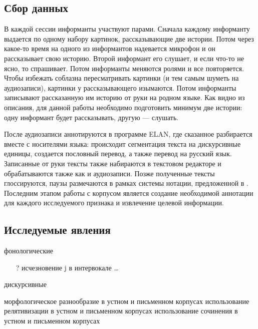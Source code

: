 \subsection{Сбор данных}
\noindent В каждой сессии информанты участвуют парами. Сначала каждому информанту выдается по одному набору картинок, рассказывающие две истории. Потом через какое-то время на одного из информантов надевается микрофон и он рассказывает свою историю. Второй информант его слушает, и если что-то не ясно, то спрашивает. Потом информанты меняются ролями и все повторяется. Чтобы избежать соблазна пересматривать картинки (и тем самым шуметь на аудиозаписи), картинки у рассказывающего изымаются. Потом информанты записывают рассказанную им историю от руки на родном языке. Как видно из описания, для данной работы необходимо подготовить минимум две истории: одну информант будет рассказывать, другую --- слушать.
\par После аудиозаписи аннотируются в программе ELAN, где сказанное разбирается вместе с носителями языка: происходит сегментация текста на дискурсивные единицы, создается пословный перевод, а также перевод на русский язык. Записанные от руки тексты также набираются в текстовом редакторе и обрабатываются также как и аудиозаписи. Позже полученные тексты глоссируются, паузы размечаются в рамках системы нотации, предложенной в \citep{kibrik14}. Последним этапом работы с корпусом является создание необходимой аннотации для каждого исследуемого признака и извлечение целевой информации.
\subsection{Исследуемые явления}
\begin{itemize}
\mytem фонологические
\begin{itemize}
\mytem скорость речи
\mytem длительность сегментов и их составляющих
\begin{itemize}
\mytem длительность гласных
\mytem VOT стопов и аффрикат
\mytem длительность фрикативных
\end{itemize}
\mytem форманты гласных
\mytem спектральная характеристика фрикативных
\mytem чередование ɐ $\sim$ a
\item[?] исчезновение j в интервокале
\mytem \dots
\end{itemize}
\mytem дискурсивные
\begin{itemize}
\mytem морфологическое разнообразие в устном и письменном корпусах
\mytem использование релятивизации в устном и письменном корпусах
\mytem использование сочинения в устном и письменном корпусах
\end{itemize}
\end{itemize}
